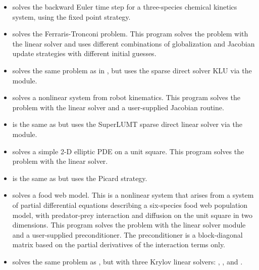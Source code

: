 \begin{itemize}
\item {}
  solves the backward Euler time step for a three-species chemical kinetics
  system, using the fixed point strategy.

\item {}
  solves the Ferraris-Tronconi problem.
  \newline
  This program solves the problem with the {\sunlinsoldense} linear solver
  and uses different combinations of globalization and Jacobian
  update strategies with different initial guesses.
\item {}
  solves the same problem as in , but uses the
  sparse direct solver KLU via the {\sunlinsolklu} module.

\item {}
  solves a nonlinear system from robot kinematics.
  \newline
  This program solves the problem with the {\sunlinsoldense} linear solver
  and a user-supplied Jacobian routine.
\item {}
  is the same as  but uses the SuperLUMT sparse direct
  linear solver via the {\sunlinsolslumt} module.

\item {}
  solves a simple 2-D elliptic PDE on a unit square.
 \newline
  This program solves the problem with the {\sunlinsolband} linear solver.
\item {}
  is the same as  but uses the Picard strategy.

\item {}
  solves a food web model.
  \newline
  This is a nonlinear system that arises from a system of partial
  differential equations describing a six-species food web population
  model, with predator-prey interaction and diffusion on the unit
  square in two dimensions.
  This program solves the problem with the {\sunlinsolspgmr} linear
  solver module and a user-supplied preconditioner. The preconditioner is a
  block-diagonal matrix based on the partial derivatives of the
  interaction terms only.
\item {}
  solves the same problem as , but with three Krylov
  linear solvers: {\sunlinsolspgmr}, {\sunlinsolspbcgs}, and {\sunlinsolsptfqmr}.
\end{itemize}

